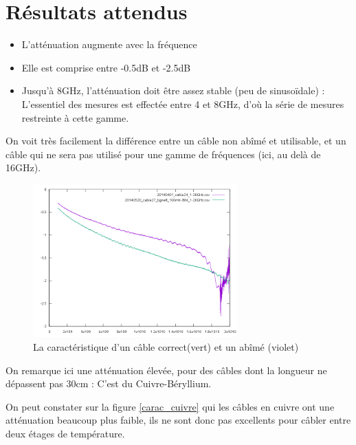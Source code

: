 \section{Résultats attendus}

\begin{itemize}
    \item L'atténuation augmente avec la fréquence
    \item Elle est comprise entre -0.5dB et -2.5dB
    \item Jusqu'à 8GHz, l'atténuation doit être assez stable (peu de sinusoïdale) : L'essentiel des mesures est effectée entre 4 et 8GHz, d'où la série de mesures restreinte à cette gamme.
\end{itemize}

On voit très facilement la différence entre un câble non abîmé et utilisable, et un câble qui ne sera pas utilisé pour une gamme de fréquences (ici, au delà de 16GHz).
\begin{figure}[h]
    \begin{center}
        \includegraphics[width=0.7\textwidth]{Images/Caracs/abime2.png}
        \caption{La caractéristique d'un câble correct(vert) et un abîmé (violet)}
        \label{Carac1}
    \end{center}
\end{figure}

On remarque ici une atténuation élevée, pour des câbles dont la longueur ne dépassent pas 30cm : C'est du Cuivre-Béryllium. 

On peut constater sur la figure \ref{carac_cuivre} qui les câbles en cuivre ont une atténuation beaucoup plus faible, ils ne sont donc pas excellents pour câbler entre deux étages de température.


